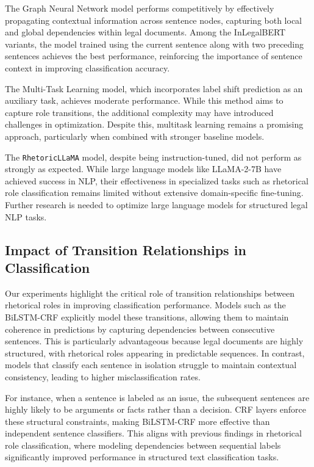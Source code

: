The Graph Neural Network model performs competitively by effectively propagating contextual information across sentence nodes, capturing both local and global dependencies within legal documents. Among the InLegalBERT variants, the model trained using the current sentence along with two preceding sentences achieves the best performance, reinforcing the importance of sentence context in improving classification accuracy.

The Multi-Task Learning model, which incorporates label shift prediction as an auxiliary task, achieves moderate performance. While this method aims to capture role transitions, the additional complexity may have introduced challenges in optimization. Despite this, multitask learning remains a promising approach, particularly when combined with stronger baseline models.

The \texttt{RhetoricLLaMA} model, despite being instruction-tuned, did not perform as strongly as expected. While large language models like LLaMA-2-7B have achieved success in NLP, their effectiveness in specialized tasks such as rhetorical role classification remains limited without extensive domain-specific fine-tuning. Further research is needed to optimize large language models for structured legal NLP tasks.

\subsection{Impact of Transition Relationships in Classification}
Our experiments highlight the critical role of transition relationships between rhetorical roles in improving classification performance. Models such as the BiLSTM-CRF explicitly model these transitions, allowing them to maintain coherence in predictions by capturing dependencies between consecutive sentences. This is particularly advantageous because legal documents are highly structured, with rhetorical roles appearing in predictable sequences. In contrast, models that classify each sentence in isolation struggle to maintain contextual consistency, leading to higher misclassification rates.

For instance, when a sentence is labeled as an issue, the subsequent sentences are highly likely to be arguments or facts rather than a decision. CRF layers enforce these structural constraints, making BiLSTM-CRF more effective than independent sentence classifiers. This aligns with previous findings in rhetorical role classification, where modeling dependencies between sequential labels significantly improved performance in structured text classification tasks.

